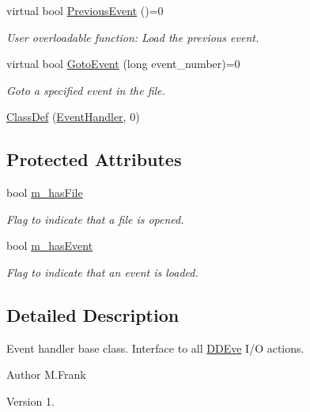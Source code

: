 \begin{DoxyCompactItemize}
virtual bool \hyperlink{class_d_d4hep_1_1_event_handler_a0942608bebbdd107c9dedbdc7311791f}{Previous\+Event} ()=0
\begin{DoxyCompactList}\small\item\em User overloadable function\+: Load the previous event. \end{DoxyCompactList}\item 
virtual bool \hyperlink{class_d_d4hep_1_1_event_handler_a09c40b0b753455c1e3df7c561ff6b069}{Goto\+Event} (long event\+\_\+number)=0
\begin{DoxyCompactList}\small\item\em Goto a specified event in the file. \end{DoxyCompactList}\item 
\hyperlink{class_d_d4hep_1_1_event_handler_a44c310a4296693f09e62adbac3fbe2c6}{Class\+Def} (\hyperlink{class_d_d4hep_1_1_event_handler}{Event\+Handler}, 0)
\end{DoxyCompactItemize}
\subsection*{Protected Attributes}
\begin{DoxyCompactItemize}
\item 
bool \hyperlink{class_d_d4hep_1_1_event_handler_acfb701f8f671fe75df92d46d846613d5}{m\+\_\+has\+File}
\begin{DoxyCompactList}\small\item\em Flag to indicate that a file is opened. \end{DoxyCompactList}\item 
bool \hyperlink{class_d_d4hep_1_1_event_handler_adccb4980638cdc1ed7792ae8583f1370}{m\+\_\+has\+Event}
\begin{DoxyCompactList}\small\item\em Flag to indicate that an event is loaded. \end{DoxyCompactList}\end{DoxyCompactItemize}


\subsection{Detailed Description}
Event handler base class. Interface to all \hyperlink{struct_d_d4hep_1_1_d_d_eve}{D\+D\+Eve} I/O actions. 

\begin{DoxyAuthor}{Author}
M.\+Frank 
\end{DoxyAuthor}
\begin{DoxyVersion}{Version}
1. 
\end{DoxyVersion}


